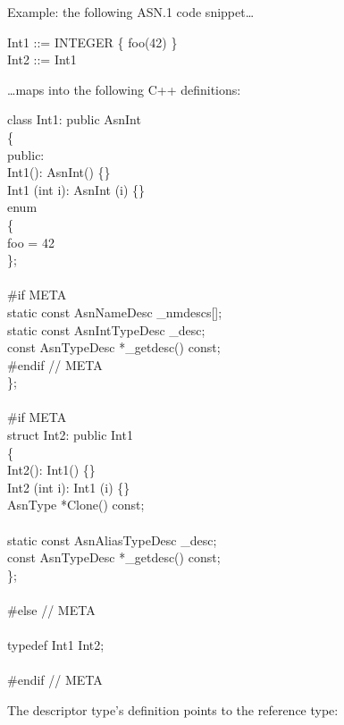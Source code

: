 Example: the following ASN.1 code snippet\dots
\begin{ASNcode}
Int1 ::= INTEGER \{ foo(42) \}\\
Int2 ::= Int1
\end{ASNcode}
\dots maps into the following C++ definitions:
\begin{Ccode}
class Int1: public AsnInt\\
\{\\
public:\+\\
                        \>\>Int1(): AsnInt() \{\}\\
                        \>\>Int1 (int i): AsnInt (i) \{\}\\
  enum\\
  \{\\
    \>foo = 42\\
  \};\\
\\
\<\#if META\\
  static const AsnNameDesc      \>\>\_nmdescs[];\\
  static const AsnIntTypeDesc   \>\>\_desc;\\
  const AsnTypeDesc     \>\>*\_getdesc() const;\-\\
\#endif // META\\
\};\\
\\
\#if META\\
struct Int2: public Int1\\
\{\+\\
                        \>\>Int2(): Int1() \{\}\\
                        \>\>Int2 (int i): Int1 (i) \{\}\\
  AsnType               \>\>*Clone() const;\\
\\
  static const AsnAliasTypeDesc \>\>\_desc;\\
  const AsnTypeDesc     \>\>*\_getdesc() const;\-\\
\};\\
\\
\#else // META\\
\\
typedef Int1 \>\>\>Int2;\\
\\
\#endif // META
\end{Ccode}

The descriptor type's definition points to the reference type:

